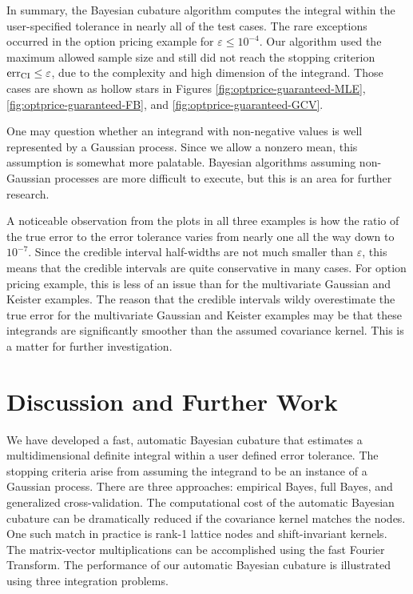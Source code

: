\documentclass[twocolumn]{svjour3}          %
\newcommand{\err}{\textup{err}}
\begin{document}
In summary, the Bayesian cubature algorithm computes the integral within the user-specified tolerance in nearly all of the test cases.  The rare exceptions occurred in the option pricing example for $\varepsilon \le 10^{-4}$. Our algorithm used the maximum allowed sample size and still did not reach the stopping criterion $\err_{\textup{CI}} \leq \varepsilon$, due to the complexity and high dimension of the integrand. Those cases are shown as hollow stars in Figures \ref{fig:optprice-guaranteed-MLE}, \ref{fig:optprice-guaranteed-FB}, and 
\ref{fig:optprice-guaranteed-GCV}.

One may question whether an integrand with non-negative values is well represented by a Gaussian process.  Since we allow a nonzero mean, this assumption is somewhat more palatable. Bayesian algorithms assuming non-Gaussian processes are more difficult to execute, but this is an area for further research.

A noticeable observation from the plots in all three examples is how the ratio of the true error to the error tolerance varies from nearly one all the way down to $10^{-7}$.  Since the credible interval half-widths are not much smaller than $\varepsilon$, this means that the credible intervals are quite conservative in many cases.  For option pricing example, this is less of an issue than for the multivariate Gaussian and Keister examples. The reason that the credible intervals wildy overestimate the true error for the multivariate Gaussian and Keister examples may be that these integrands are significantly smoother than the assumed covariance kernel.  This is a matter for further investigation.




\section{Discussion and Further Work}

We have developed a fast, automatic Bayesian cubature that estimates a multidimensional definite integral within a user defined error tolerance.  The stopping criteria arise from assuming the integrand to be an instance of a Gaussian process. There are three approaches:  empirical Bayes, full Bayes, and generalized cross-validation.  The computational cost of the automatic Bayesian cubature can be dramatically reduced if the covariance kernel matches the nodes.  One such match in practice is rank-1 lattice nodes and shift-\linebreak[4]invariant kernels.  The matrix-vector multiplications can be accomplished using the fast Fourier Transform.  The performance of our automatic Bayesian cubature is illustrated using three integration problems.  
\end{document}
